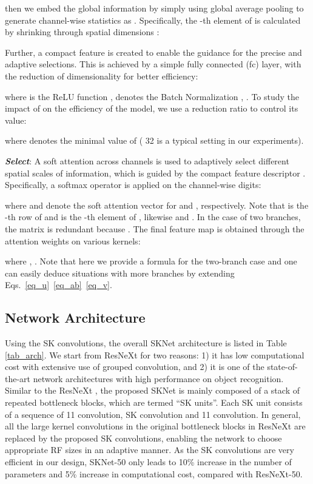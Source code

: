 \documentclass[10pt,twocolumn,letterpaper]{article}
\begin{document}
	then we embed the global information by simply using global average pooling to generate channel-wise statistics as . Specifically, the -th element of  is calculated by shrinking  through spatial dimensions :
	
	
	Further, a compact feature  is created to enable the guidance for the precise and adaptive selections. This is achieved by a simple fully connected (fc) layer, with the reduction of dimensionality for better efficiency:
	
	where  is the ReLU function \cite{nair2010rectified},  denotes the Batch Normalization \cite{ioffe2015batch}, . To study the impact of  on the efficiency of the model, we use a reduction ratio  to control its value:
	
	where  denotes the minimal value of  ( 32 is a typical setting in our experiments).

	
	\textbf{\emph{Select}}: A soft attention across channels is used to adaptively select different spatial scales of information, which is guided by the compact feature descriptor . Specifically, a {softmax} operator is applied on the channel-wise digits:
	
	where  and  denote the soft attention vector for  and , respectively. Note that  is the -th row of  and  is the -th element of , likewise  and . In the case of two branches, the matrix  is redundant because . The final feature map  is obtained through the attention weights on various kernels:
	
	where , . Note that here we provide a formula for the two-branch case and one can easily deduce situations with more branches by extending Eqs.~\eqref{eq_u}~\eqref{eq_ab}~\eqref{eq_v}. 
	
	
	\subsection{Network Architecture}\label{subsec:arch}
	Using the SK convolutions, the overall SKNet architecture is listed in Table \ref{tab_arch}. We start from ResNeXt \cite{xie2017aggregated} for two reasons: 1) it has low computational cost with extensive use of grouped convolution, and 2) it is one of the state-of-the-art network architectures with high performance on object recognition. Similar to the ResNeXt \cite{xie2017aggregated}, the proposed SKNet is mainly composed of a stack of repeated bottleneck blocks, which are termed ``SK units''. Each SK unit consists of a sequence of 11 convolution, SK convolution and 11 convolution. In general, all the large kernel convolutions in the original bottleneck blocks in ResNeXt are replaced by the proposed SK convolutions, enabling the network to choose appropriate RF sizes in an adaptive manner. As the SK convolutions are very efficient in our design, SKNet-50 only leads to 10\% increase in the number of parameters  and 5\% increase in computational cost, compared with ResNeXt-50.
	
\end{document}
